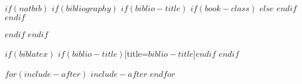 \documentclass[doctor,twoside,chapterhead,otf]{znufethesis}
\begin{document}
$if(natbib)$
$if(bibliography)$
$if(biblio-title)$
$if(book-class)$
\renewcommand\bibname{$biblio-title$}
$else$
\renewcommand\refname{$biblio-title$}
$endif$
$endif$


$endif$
$endif$

$if(biblatex)$
\printbibliography$if(biblio-title)$[title=$biblio-title$]$endif$
$endif$

\ifodd\thepage
\blankpage
\fi

\appendix
\backmatter
\cleardoublepage
\pagestyle{appendixpage}
\renewcommand{\chapterlabel}{\appendixname} %




$for(include-after)$
$include-after$
$endfor$

\cleardoublepage
\renewcommand{\chapterlabel}{\ackname} %

\end{document}
